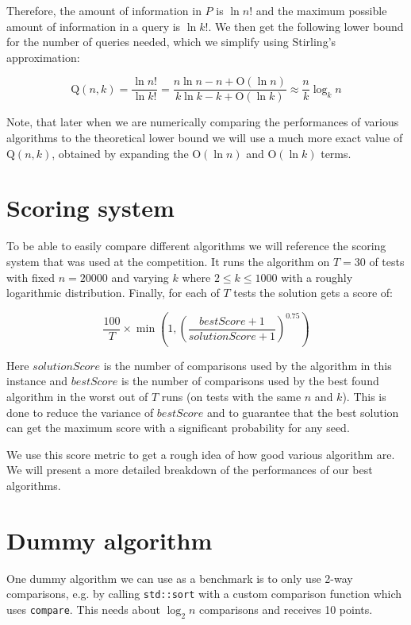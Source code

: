 \documentclass{article}
\begin{document}
Therefore, the amount of information in $ P $ is $ \ln{n!} $ and the maximum possible amount of information in a query is $ \ln{k!} $. We then get the following lower bound for the number of queries needed, which we simplify using Stirling's approximation:

$$ \mathrm{Q}(n, k) = \frac{\ln{n!}}{\ln{k!}} = \frac{ n \ln{n} - n + \mathrm{O}(\ln{n}) }{ k \ln{k} - k + \mathrm{O}(\ln{k}) } \approx \frac{n}{k}\log_k{n} $$

Note, that later when we are numerically comparing the performances of various algorithms to the theoretical lower bound we will use a much more exact value of $ \mathrm{Q}(n, k) $, obtained by expanding the $ \mathrm{O}(\ln{n}) $ and $ \mathrm{O}(\ln{k}) $ terms.

\section{Scoring system}

To be able to easily compare different algorithms we will reference the scoring system that was used at the competition. It runs the algorithm on $ T = 30 $ of tests with fixed $ n = 20000 $ and varying $ k $ where $ 2 \leq k \leq 1000 $ with a roughly logarithmic distribution. Finally,  for each of $ T $ tests the solution gets a score of:

$$ \frac{100}{T} \times \min\left(1, \left(\frac{bestScore + 1}{solutionScore + 1}\right)^{0.75}\right) $$

Here $ solutionScore $ is the number of comparisons used by the algorithm in this instance and $ bestScore $ is the number of comparisons used by the best found algorithm in the worst out of $ T $ runs (on tests with the same $ n $ and $ k $). This is done to reduce the variance of $ bestScore $ and to guarantee that the best solution can get the maximum score with a significant probability for any seed.

We use this score metric to get a rough idea of how good various algorithm are. We will present a more detailed breakdown of the performances of our best algorithms.

\section{Dummy algorithm}

One dummy algorithm we can use as a benchmark is to only use 2-way comparisons, e.g. by calling \verb|std::sort| with a custom comparison function which uses \verb|compare|. This needs about $ \log_2{n} $ comparisons and receives 10 points.
\end{document}
